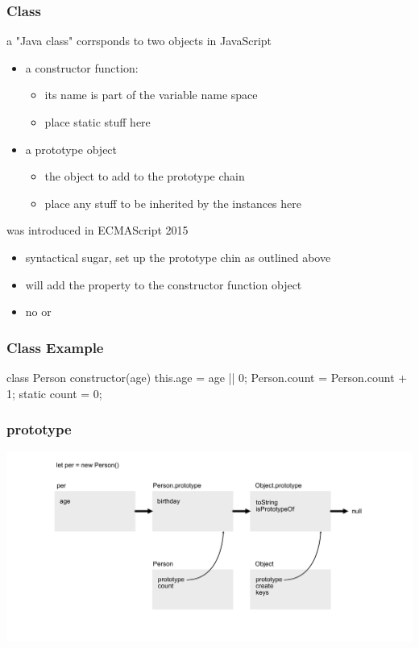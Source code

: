 \begin{frame}[fragile] \frametitle{Class}
a "Java class" corrsponds to two objects in JavaScript
\begin{itemize}
  \item a constructor function:
  \begin{itemize}
    \item its name is part of the variable name space
    \item place static stuff here
  \end{itemize}
  \item a prototype object
  \begin{itemize}
    \item the object to add to the prototype chain
    \item place any stuff to be inherited by the instances here
  \end{itemize}
\end{itemize}
\vspace{5mm}

 was introduced in ECMAScript 2015
\begin{itemize}
  \item syntactical sugar, set up the prototype chin as outlined above
  \item {} will add the property to the constructor function object
  \item no  or 
\end{itemize}
\end{frame}
\begin{frame}[fragile] \frametitle{Class Example}
\begin{CodeBox}{}
class Person {
  constructor(age) {
    this.age = age || 0;
    Person.count = Person.count + 1;
  }
  static count = 0;
}
\end{CodeBox}
\end{frame}

\begin{frame}[fragile] \frametitle{prototype}
  \centering
  \includegraphics[width=14cm]{img/prototype_chain6}
\end{frame}


